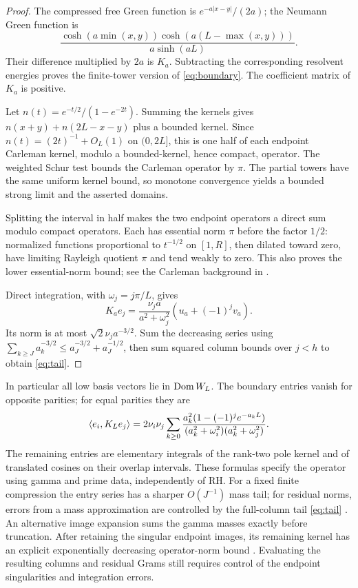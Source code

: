 \begin{proof}
The compressed free Green function is $e^{-a|x-y|}/(2a)$; the Neumann
Green function is
\[
\frac{\cosh(a\min(x,y))\cosh(a(L-\max(x,y)))}{a\sinh(aL)}.
\]
Their difference multiplied by $2a$ is $K_a$. Subtracting the corresponding
resolvent energies proves the finite-tower version of \eqref{eq:boundary}.
The coefficient matrix of $K_a$ is positive.

Let $n(t)=e^{-t/2}/(1-e^{-2t})$. Summing the kernels gives
$n(x+y)+n(2L-x-y)$ plus a bounded kernel. Since
$n(t)=(2t)^{-1}+O_L(1)$ on $(0,2L]$, this is one half of each endpoint
Carleman kernel, modulo a bounded-kernel, hence compact, operator. The
weighted Schur test bounds the Carleman operator by $\pi$. The partial
towers have the same uniform kernel bound, so monotone convergence yields
a bounded strong limit and the asserted domains.

Splitting the interval in half makes the two endpoint operators a direct
sum modulo compact operators. Each has essential norm $\pi$ before the
factor $1/2$: normalized functions proportional to $t^{-1/2}$ on $[1,R]$,
then dilated toward zero, have limiting Rayleigh quotient $\pi$ and tend
weakly to zero. This also proves the lower essential-norm bound; see the
Carleman background in \cite{Yafaev}.

Direct integration, with $\omega_j=j\pi/L$, gives
\begin{equation}\label{eq:column}
K_ae_j=\frac{\nu_j a}{a^2+\omega_j^2}(u_a+(-1)^jv_a).
\end{equation}
Its norm is at most $\sqrt2\nu_j a^{-3/2}$. Sum the decreasing series
using $\sum_{k\ge J}a_k^{-3/2}\le a_J^{-3/2}+a_J^{-1/2}$, then sum squared
column bounds over $j<h$ to obtain \eqref{eq:tail}.
\end{proof}

In particular all low basis vectors lie in $\operatorname{Dom} W_L$. The boundary entries
vanish for opposite parities; for equal parities they are
\begin{equation}\label{eq:entries}
\langle e_i,K_Le_j\rangle=2\nu_i\nu_j\sum_{k\ge0}
\frac{a_k^2(1-(-1)^j e^{-a_kL})}
{(a_k^2+\omega_i^2)(a_k^2+\omega_j^2)}.
\end{equation}
The remaining entries are elementary integrals of the rank-two pole
kernel and of translated cosines on their overlap intervals. These formulas
specify the operator using gamma and prime data, independently of RH.
For a fixed finite compression the entry series has a sharper $O(J^{-1})$
mass tail; for residual norms, errors from a mass approximation are
controlled by the full-column tail \eqref{eq:tail}
\cite[Section 6]{Companion}.
An alternative image expansion sums the gamma masses exactly before
truncation. After retaining the singular endpoint images, its remaining
kernel has an explicit exponentially decreasing operator-norm bound
\cite[Section 5]{Companion}. Evaluating the resulting columns and residual
Grams still requires control of the endpoint singularities and integration
errors.

